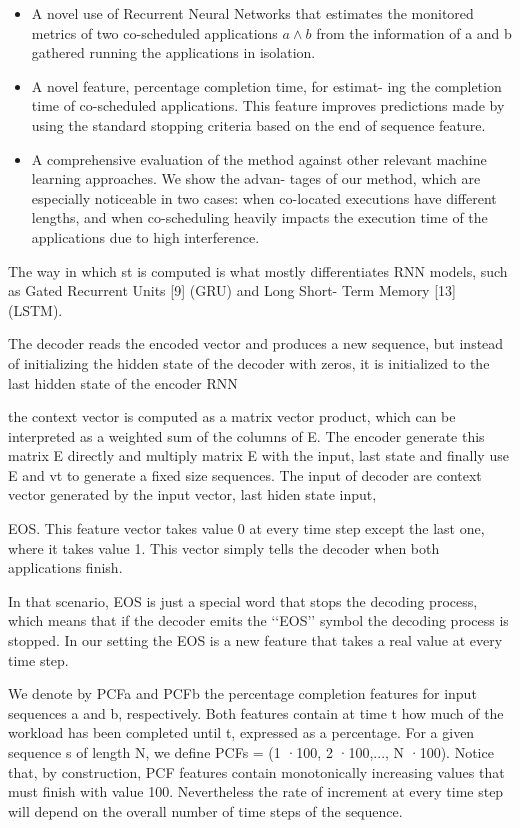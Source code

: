 \documentclass[UTF8]{article}
\begin{document}
\begin{itemize}
	\item  A novel use of Recurrent Neural Networks that estimates the monitored metrics of two co-scheduled applications $a \wedge b$ from the information of a and b gathered running the applications in isolation.
	\item A novel feature, percentage completion time, for estimat- ing the completion time of co-scheduled applications. This feature improves predictions made by using the standard stopping criteria based on the end of sequence feature.
	\item A comprehensive evaluation of the method against other relevant machine learning approaches. We show the advan- tages of our method, which are especially noticeable in two cases: when co-located executions have different lengths, and when co-scheduling heavily impacts the execution time of the applications due to high interference.
\end{itemize}

The way in which st is computed is what mostly differentiates RNN models, such as Gated Recurrent Units [9] (GRU) and Long Short- Term Memory [13] (LSTM).

The decoder reads the encoded vector and produces a new sequence, but instead of initializing the hidden state of the decoder with zeros, it is initialized to the last hidden state of the encoder RNN

the context vector is computed as a matrix vector product, which can be interpreted as a weighted sum of the columns of E. The encoder generate this matrix E directly and multiply matrix E with the input, last state and finally use E and vt to generate a fixed size sequences. The input of decoder are context vector generated by the input vector, last hiden state input, 

EOS. This feature vector takes value 0 at every time step except the last one, where it takes value 1. This vector simply tells the decoder when both applications finish.

In that scenario, EOS is just a special word that stops the decoding process, which means that if the decoder emits the ‘‘EOS’’ symbol the decoding process is stopped. In our setting the EOS is a new feature that takes a real value at every time step.

We denote by PCFa and PCFb the percentage completion features for input sequences a and b, respectively. Both features contain at time t how much of the workload has been completed
until t, expressed as a percentage. For a given sequence s of length N, we define PCFs = (1 ·100, 2 ·100,..., N ·100). Notice that, by construction, PCF features contain monotonically increasing values that must finish with value 100. Nevertheless the rate of increment at every time step will depend on the overall number of time steps of the sequence.
\end{document}
